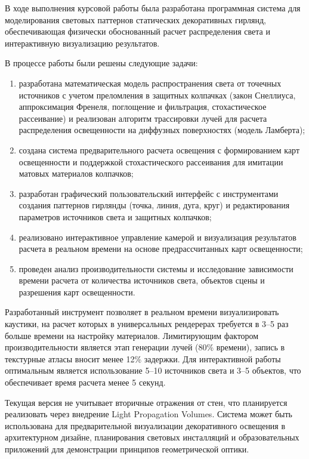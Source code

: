 
В ходе выполнения курсовой работы была разработана программная система для моделирования световых паттернов статических декоративных гирлянд, обеспечивающая физически обоснованный расчет распределения света и интерактивную визуализацию результатов.

В процессе работы были решены следующие задачи:

\begin{enumerate}
    \item разработана математическая модель распространения света от точечных источников с учетом преломления в защитных колпачках (закон Снеллиуса, аппроксимация Френеля, поглощение и фильтрация, стохастическое рассеивание) и реализован алгоритм трассировки лучей для расчета распределения освещенности на диффузных поверхностях (модель Ламберта);
    
    \item создана система предварительного расчета освещения с формированием карт освещенности и поддержкой стохастического рассеивания для имитации матовых материалов колпачков;
    
    \item разработан графический пользовательский интерфейс с инструментами создания паттернов гирлянды (точка, линия, дуга, круг) и редактирования параметров источников света и защитных колпачков;
    
    \item реализовано интерактивное управление камерой и визуализация результатов расчета в реальном времени на основе предрассчитанных карт освещенности;
    
    \item проведен анализ производительности системы и исследование зависимости времени расчета от количества источников света, объектов сцены и разрешения карт освещенности.
\end{enumerate}

Разработанный инструмент позволяет в реальном времени визуализировать каустики, на расчет которых в универсальных рендерерах требуется в 3--5 раз больше времени на настройку материалов. Лимитирующим фактором производительности является этап генерации лучей (80\% времени), запись в текстурные атласы вносит менее 12\% задержки. Для интерактивной работы оптимальным является использование 5--10 источников света и 3--5 объектов, что обеспечивает время расчета менее 5 секунд.

Текущая версия не учитывает вторичные отражения от стен, что планируется реализовать через внедрение Light Propagation Volumes. Система может быть использована для предварительной визуализации декоративного освещения в архитектурном дизайне, планирования световых инсталляций и образовательных приложений для демонстрации принципов геометрической оптики.

\clearpage
